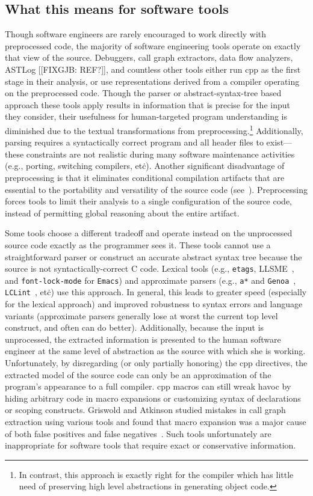 \documentclass{article}
\newcommand{\Cpp}{\mbox{\textsf{cpp}}}
\newcommand{\C}{\mbox{\textsf{C}}}
\newcommand{\eg}{e.g.,}
\newcommand{\etc}{etc\.}
\begin{document}
\subsection{What this means for software tools}

Though software engineers are rarely encouraged to work directly with
preprocessed code, the majority of software engineering tools operate on
exactly that view of the source.  Debuggers, call graph extractors, data
flow analyzers, ASTLog [[FIXGJB: REF?]], and countless other tools
either run \Cpp{} as the first stage in their analysis, or use
representations derived from a compiler operating on the preprocessed
code.  Though the parser or abstract-syntax-tree based approach these
tools apply results in information that is precise for the input they
consider, their usefulness for human-targeted program understanding is
diminished due to the textual transformations from
preprocessing.\footnote{In contrast, this approach is exactly right for
  the compiler which has little need of preserving high level
  abstractions in generating object code.}  Additionally, parsing
requires a syntactically correct program and all header files to
exist---these constraints are not realistic during many software
maintenance activities (\eg{} porting, switching compilers, \etc{}).
Another significant disadvantage of preprocessing is that it eliminates
conditional compilation artifacts that are essential to the portability
and versatility of the source code (see~\cite{Krone94}).  Preprocessing
forces tools to limit their analysis to a single configuration of the
source code, instead of permitting global reasoning about the entire artifact.

Some tools choose a different tradeoff and operate instead on the
unprocessed source code exactly as the programmer sees it.  These tools
cannot use a straightforward parser or construct an accurate abstract
syntax tree because the source is not syntactically-correct \C{} code.
Lexical tools (\eg{} \texttt{etags}, LLSME~\cite{Murphy95}, and
\texttt{font-lock-mode} for \texttt{Emacs}) and approximate parsers
(\eg{} \texttt{a*} and \texttt{Genoa}~\cite{Griswold96},
\texttt{LCLint}~\cite{LCLint}, \etc{}) use this approach.  In general,
this leads to greater speed (especially for the lexical approach) and
improved robustness to syntax errors and language variants (approximate
parsers generally lose at worst the current top level construct, and
often can do better). Additionally, because the input is unprocessed,
the extracted information is presented to the human software engineer at
the same level of abstraction as the source with which she is working.
Unfortunately, by disregarding (or only partially honoring) the \Cpp{}
directives, the extracted model of the source code can only be an
approximation of the program's appearance to a full compiler.  \Cpp{}
macros can still wreak havoc by hiding arbitrary code in macro
expansions or customizing syntax of declarations or scoping constructs.
Griswold and Atkinson studied mistakes in call graph extraction using
various tools and found that macro expansion was a major cause of both
false positives and false negatives~\cite{Griswold96}.  Such tools
unfortunately are inappropriate for software tools that require exact or
conservative information.
\end{document}
